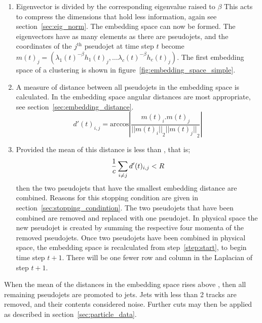 \begin{enumerate}
        \item \label{step:compression} Eigenvector is divided by the corresponding eigenvalue raised to \(\beta\)
            This acts to compress the dimensions that hold less information, again see section~\ref{sec:eig_norm}.
            The embedding space can now be formed.
            The eigenvectors have as many elements as there are pseudojets, and the coordinates of
            the \(j^\text{th}\) pseudojet at time step \(t\)
            become \(m(t)_j = \left(\lambda_1(t)^{-\beta} h_1(t)_j, \dots \lambda_c(t)^{-\beta} h_c(t)_j\right)\).
            The first embedding space of a clustering is shown in figure~\ref{fig:embedding_space_simple}.

        \item  A measure of distance between all pseudojets in the embedding space is calculated.
            In the embedding space angular distances are most appropriate, see section~\ref{sec:embedding_distance}.
            \begin{equation}
                d'(t)_{i, j} = \text{arccos}\left|\frac{m(t)_i.m(t)_j}{{||m(t)_i||}_2 {||m(t)_j||}_2}\right|
            \end{equation}

        \item\label{step:stoppingcondition}

            Provided the mean of this distance is less than \stoppingdeltar{}, that is;
            \begin{equation}
                \frac{1}{c}\sum_{i\ne j} d'(t)_{i, j} < R{}
            \end{equation}
            then the two pseudojets that have the smallest embedding distance are combined.
            Reasons for this stopping condition are given in section~\ref{sec:stopping_condintion}.
        The two pseudojets that have been combined are removed and replaced with one pseudojet.
        In physical space the new pseudojet is created by summing the respective four momenta of the removed pseudojets.
        Once two pseudojets have been combined in physical space, the embedding space is recalculated from step~\ref{step:start}, 
        to begin time step \(t+1\).
        There will be one fewer row and column in the Laplacian of step \(t+1\).
    \end{enumerate}

    When the mean of the distances in the embedding space rises above \stoppingdeltar{},
    then all remaining pseudojets are promoted to jets.
    Jets with less than 2 tracks are removed, and their contents considered noise.
    Further cuts may then be applied as described in section~\ref{sec:particle_data}.

